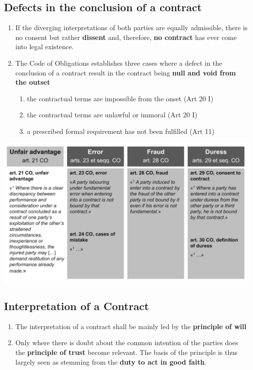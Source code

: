 \documentclass[11pt]{article}
\theoremstyle{definition}
\begin{document}
\subsection{Defects in the conclusion of a contract}
\begin{enumerate}[label=\arabic* ]
	\item If the diverging interpretations of both parties are equally admissible, there is no consent but rather \textbf{dissent} and, therefore, \textbf{no contract} has ever come into legal existence.
	\item The Code of Obligations establishes three cases where a defect in the conclusion of a contract result in the contract being \textbf{null and void from the outset}
	\begin{enumerate}
		\item the contractual terms are impossible from the onset (Art 20 I)
		\item the contractual terms are unlawful or immoral (Art 20 I)
		\item a prescribed formal requirement has not been fulfilled (Art 11)
	\end{enumerate}
\end{enumerate}

\begin{center}
	\includegraphics[width=0.8\linewidth]{img/defects_contract}
\end{center}

\subsection{Interpretation of a Contract}
\begin{enumerate}
	\item The interpretation of a contract shall be mainly led by the \textbf{principle of will}
	\item Only where there is doubt about the common intention of the parties does the \textbf{principle of trust} become relevant. The basis of the principle is thus largely seen as stemming from the \textbf{duty to act in good faith}.
\end{enumerate}
\end{document}

